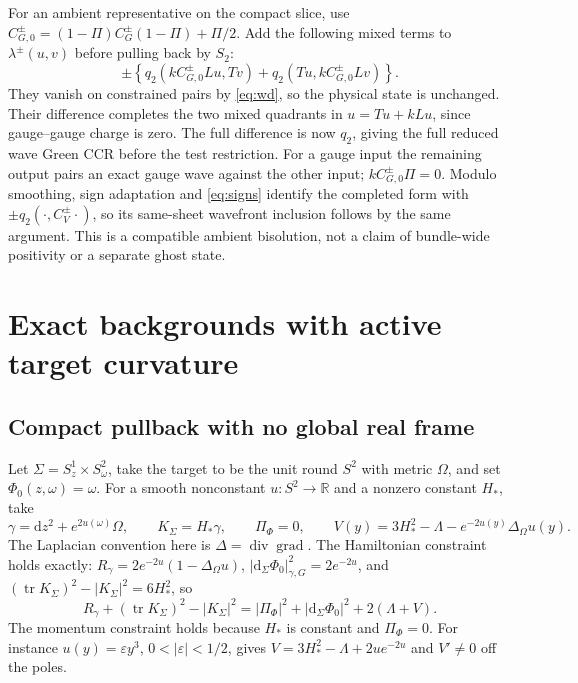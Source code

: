 \documentclass[11pt]{article}
\newcommand{\dd}{\mathrm d}
\newcommand{\tr}{\operatorname{tr}}
\begin{document}
For an ambient representative on the compact slice, use \(C_{G,0}^\pm=(1-\Pi)C_G^\pm(1-\Pi)+\Pi/2\). Add the following mixed terms to \(\lambda^\pm(u,v)\) before pulling back by \(S_2\):
\begin{equation}
 \pm\left\{q_2(k C_{G,0}^\pm L u,Tv)
          +q_2(Tu,k C_{G,0}^\pm L v)\right\}.
 \label{eq:ambient}
\end{equation}
They vanish on constrained pairs by \eqref{eq:wd}, so the physical state is unchanged. Their difference completes the two mixed quadrants in \(u=Tu+kLu\), since gauge--gauge charge is zero. The full difference is now \(q_2\), giving the full reduced wave Green CCR before the test restriction. For a gauge input the remaining output pairs an exact gauge wave against the other input; \(k C_{G,0}^\pm\Pi=0\). Modulo smoothing, sign adaptation and \eqref{eq:signs} identify the completed form with \(\pm q_2(\cdot,C_V^\pm\cdot)\), so its same-sheet wavefront inclusion follows by the same argument. This is a compatible ambient bisolution, not a claim of bundle-wide positivity or a separate ghost state.

\section{Exact backgrounds with active target curvature}\label{sec:examples}

\subsection{Compact pullback with no global real frame}

Let \(\Sigma=S^1_z\times S^2_\omega\), take the target to be the unit round \(S^2\) with metric \(\Omega\), and set \(\Phi_0(z,\omega)=\omega\). For a smooth nonconstant \(u:S^2\to\mathbb R\) and a nonzero constant \(H_*\), take
\[
 \gamma=\dd z^2+e^{2u(\omega)}\Omega,\qquad
 K_\Sigma=H_*\gamma,\qquad \Pi_\Phi=0,\qquad
 V(y)=3H_*^2-\Lambda-e^{-2u(y)}\Delta_\Omega u(y).
\]
The Laplacian convention here is \(\Delta=\operatorname{div}\operatorname{grad}\). The Hamiltonian constraint holds exactly: \(R_\gamma=2e^{-2u}(1-\Delta_\Omega u)\), \(|\dd_\Sigma\Phi_0|_{\gamma,G}^2=2e^{-2u}\), and \((\tr K_\Sigma)^2-|K_\Sigma|^2=6H_*^2\), so
\[
 R_\gamma+(\tr K_\Sigma)^2-|K_\Sigma|^2
       =|\Pi_\Phi|^2+|\dd_\Sigma\Phi_0|^2+2(\Lambda+V).
\]
The momentum constraint holds because \(H_*\) is constant and \(\Pi_\Phi=0\). For instance \(u(y)=\varepsilon y^3\), \(0<|\varepsilon|<1/2\), gives \(V=3H_*^2-\Lambda+2u e^{-2u}\) and \(V'\ne0\) off the poles.
\end{document}
